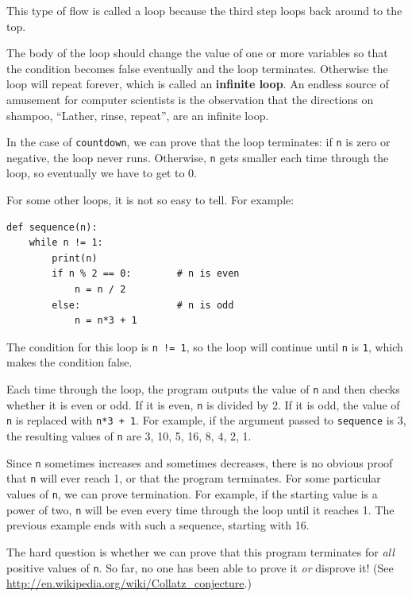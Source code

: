 \documentclass[10pt]{book}
\begin{document}
This type of flow is called a loop because the third step
loops back around to the top.  

The body of the loop should change the value of one or more variables
so that the condition becomes false eventually and the loop
terminates.  Otherwise the loop will repeat forever, which is called
an {\bf infinite loop}.  An endless source of amusement for computer
scientists is the observation that the directions on shampoo,
``Lather, rinse, repeat'', are an infinite loop.

In the case of {\tt countdown}, we can prove that the loop
terminates: if {\tt n} is zero or negative, the loop never runs.
Otherwise, {\tt n} gets smaller each time through the
loop, so eventually we have to get to 0.

For some other loops, it is not so easy to tell.  For example:

\begin{verbatim}
def sequence(n):
    while n != 1:
        print(n)
        if n % 2 == 0:        # n is even
            n = n / 2
        else:                 # n is odd
            n = n*3 + 1
\end{verbatim}
%
The condition for this loop is {\tt n != 1}, so the loop will continue
until {\tt n} is {\tt 1}, which makes the condition false.

Each time through the loop, the program outputs the value of {\tt n}
and then checks whether it is even or odd.  If it is even, {\tt n} is
divided by 2.  If it is odd, the value of {\tt n} is replaced with
{\tt n*3 + 1}. For example, if the argument passed to {\tt sequence}
is 3, the resulting values of {\tt n} are 3, 10, 5, 16, 8, 4, 2, 1.

Since {\tt n} sometimes increases and sometimes decreases, there is no
obvious proof that {\tt n} will ever reach 1, or that the program
terminates.  For some particular values of {\tt n}, we can prove
termination.  For example, if the starting value is a power of two,
{\tt n} will be even every time through the loop
until it reaches 1. The previous example ends with such a sequence,
starting with 16.

The hard question is whether we can prove that this program terminates
for {\em all} positive values of {\tt n}.  So far, no one has
been able to prove it {\em or} disprove it!  (See
  \url{http://en.wikipedia.org/wiki/Collatz_conjecture}.)
\end{document}
